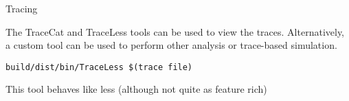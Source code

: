 \begin{frame}[fragile]{Tracing}

The TraceCat and TraceLess tools can be used to view the traces. 
Alternatively, a custom tool can be used to perform other analysis or
trace-based simulation.

\begin{lstlisting}
build/dist/bin/TraceLess $(trace file)
\end{lstlisting}

This tool behaves like {\ttfamily less} (although not quite as feature rich)

\end{frame}
